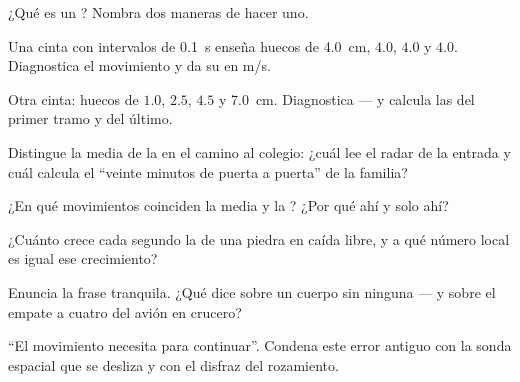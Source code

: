 \begin{exercise}[$\star$]\label{exo:g9:uniform-varied-motion:1}
¿Qué es un ? Nombra dos maneras
de hacer uno.
\end{exercise}

\begin{exercise}[$\star$]\label{exo:g9:uniform-varied-motion:2}
Una cinta con intervalos de \qty{0.1}{s} enseña huecos de
\qty{4.0}{cm}, $4.0$, $4.0$ y $4.0$. Diagnostica el movimiento y da su
 en \unit{m/s}.
\end{exercise}

\begin{exercise}[$\star$]\label{exo:g9:uniform-varied-motion:3}
Otra cinta: huecos de $1.0$, $2.5$, $4.5$ y \qty{7.0}{cm}. Diagnostica
--- y calcula las  del primer tramo y del último.
\end{exercise}

\begin{exercise}[$\star$]\label{exo:g9:uniform-varied-motion:4}
Distingue la media de la  en el camino al
colegio: ¿cuál lee el radar de la entrada y cuál calcula el ``veinte
minutos de puerta a puerta'' de la familia?
\end{exercise}

\begin{exercise}[$\star$]\label{exo:g9:uniform-varied-motion:5}
¿En qué movimientos coinciden la media y la ? ¿Por qué ahí y solo ahí?
\end{exercise}

\begin{exercise}[$\star$]\label{exo:g9:uniform-varied-motion:6}
¿Cuánto crece cada segundo la  de una piedra en caída
libre, y a qué número local es igual ese crecimiento?
\end{exercise}

\begin{exercise}[$\star$]\label{exo:g9:uniform-varied-motion:7}
Enuncia la frase tranquila. ¿Qué dice sobre un cuerpo sin ninguna
 --- y sobre el empate a cuatro del avión en crucero?
\end{exercise}

\begin{exercise}[$\star$]\label{exo:g9:uniform-varied-motion:8}
``El movimiento necesita  para continuar''. Condena este
error antiguo con la sonda espacial que se desliza y con el disfraz del
rozamiento.
\end{exercise}


